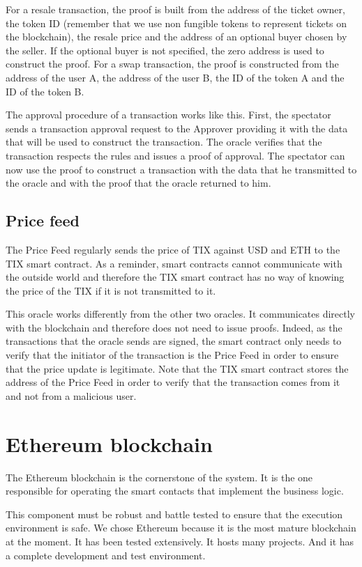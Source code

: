 \documentclass[a4paper,11pt,oneside]{report}
\begin{document}
For a resale transaction, the proof is built from the address of the ticket owner, the token ID (remember that we use non fungible tokens to represent tickets on the blockchain), the resale price and the address of an optional buyer chosen by the seller. If the optional buyer is not specified, the zero address is used to construct the proof. For a swap transaction, the proof is constructed from the address of the user A, the address of the user B, the ID of the token A and the ID of the token B.

The approval procedure of a transaction works like this. First, the spectator sends a transaction approval request to the Approver providing it with the data that will be used to construct the transaction. The oracle verifies that the transaction respects the rules and issues a proof of approval. The spectator can now use the proof to construct a transaction with the data that he transmitted to the oracle and with the proof that the oracle returned to him.

\subsection{Price feed}
The Price Feed regularly sends the price of TIX against USD and ETH to the TIX smart contract. As a reminder, smart contracts cannot communicate with the outside world and therefore the TIX smart contract has no way of knowing the price of the TIX if it is not transmitted to it.

This oracle works differently from the other two oracles. It communicates directly with the blockchain and therefore does not need to issue proofs. Indeed, as the transactions that the oracle sends are signed, the smart contract only needs to verify that the initiator of the transaction is the Price Feed in order to ensure that the price update is legitimate. Note that the TIX smart contract stores the address of the Price Feed in order to verify that the transaction comes from it and not from a malicious user.

\section{Ethereum blockchain}
The Ethereum blockchain is the cornerstone of the system. It is the one responsible for operating the smart contacts that implement the business logic.

This component must be robust and battle tested to ensure that the execution environment is safe. We chose Ethereum because it is the most mature blockchain at the moment. It has been tested extensively. It hosts many projects. And it has a complete development and test environment.
\end{document}
